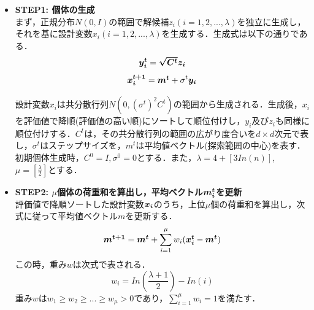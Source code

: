 \documentclass[a4j,11pt]{jarticle}
\begin{document}
\begin{itemize}
\item {\bf STEP1: 個体の生成} 　\\
まず，正規分布$N(0,I)$の範囲で解候補$z_i (i=1,2,...,\lambda)$を独立に生成し，それを基に設計変数$x_i (i=1,2,...,\lambda)$を生成する．生成式は以下の通りである．
\begin{equation}
\label{eq:cmaes-yi}
\mbox{\boldmath $y_i^t$}=\mbox{\boldmath $\sqrt{C^t}z_i$}
\end{equation}
\begin{equation}
\label{eq:cmaes-xi}
\mbox{\boldmath $x_i^{t+1}$}=\mbox{\boldmath $m^t$}+ \sigma ^t \mbox{\boldmath $y_i$}
\end{equation}

設計変数$x_i$は共分散行列$N(0,(\sigma^t)^2 C^t)$の範囲から生成される．生成後，$x_i$を評価値で降順(評価値の高い順)にソートして順位付けし，$y_i$及び$z_i$も同様に順位付けする．$C^t$は，その共分散行列の範囲の広がり度合いを$d \times d$次元で表し，$\sigma^t$はステップサイズを，$m^t$は平均値ベクトル(探索範囲の中心)を表す．初期個体生成時，$C^0=I, \sigma^0=0$とする．また，$\lambda=4+[3In(n)]$, $\mu=[\frac{\lambda}{2}]$とする．

\item {\bf STEP2: $\mu$個体の荷重和を算出し，平均ベクトル$\mbox{\boldmath $m_i^t$}$を更新} \\
評価値で降順ソートした設計変数$\mbox{\boldmath $x_i$}$のうち，上位$\mu$個の荷重和を算出し，次式に従って平均値ベクトル$m$を更新する．
\begin{equation}
\label{eq:cmaes-mi}
\mbox{\boldmath $m^{t+1}$}=\mbox{\boldmath $m^t$}+ \sum_{i=1}^{\mu}w_i(\mbox{\boldmath $x_i^t$}-\mbox{\boldmath $m^t$})
\end{equation}
この時，重み$w$は次式で表される．
\begin{equation}
\label{eq:cmaes-w}
w_i=In(\frac{\lambda+1}{2})-In(i)
\end{equation}
重み$w$は$w_1 \geq w_2 \geq ... \geq w_\mu > 0$であり，$\sum_{i=1}^{\mu}w_i=1$を満たす．


\end{itemize}
\end{document}
